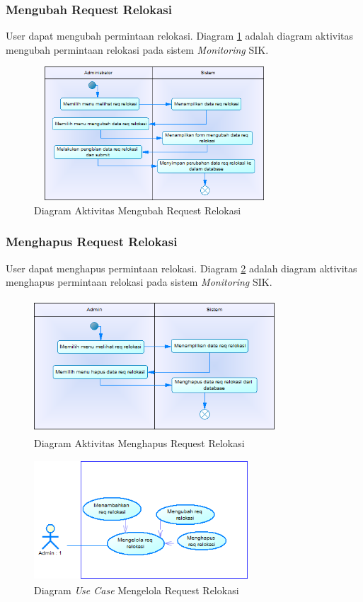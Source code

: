 	\subsubsection{Mengubah Request Relokasi}
	User dapat mengubah permintaan relokasi. Diagram \ref{figure:activity_mengubah_req_relokasi} adalah diagram aktivitas mengubah permintaan relokasi pada sistem \textit{Monitoring} SIK.
	\begin{figure}[h]
	\centerline {\includegraphics[width=9cm,height=5cm]{bab4/ActivityDiagram_MengubahReqRelokasi.png}}
	\caption{Diagram Aktivitas Mengubah Request Relokasi}
	\label{figure:activity_mengubah_req_relokasi}
	\end{figure}

	\subsubsection{Menghapus Request Relokasi}
	User dapat menghapus permintaan relokasi. Diagram \ref{figure:activity_menghapus_req_relokasi} adalah diagram aktivitas menghapus permintaan relokasi pada sistem \textit{Monitoring} SIK.
	\begin{figure}[h]
	\centerline {\includegraphics[width=9cm,height=5cm]{bab4/ActivityDiagram_MenghapusReqRelokasi.png}}
	\caption{Diagram Aktivitas Menghapus Request Relokasi}
	\label{figure:activity_menghapus_req_relokasi}
	\end{figure}		

	\begin{figure}[h]
	\centerline {\includegraphics[width=8cm,height=4.5cm]{bab4/use-case-mengelola-req-relokasi.png}}
	\caption{Diagram \textit{Use Case} Mengelola Request Relokasi}
	\label{figure:use_case_mengelola_req_relokasi}
	\end{figure}

